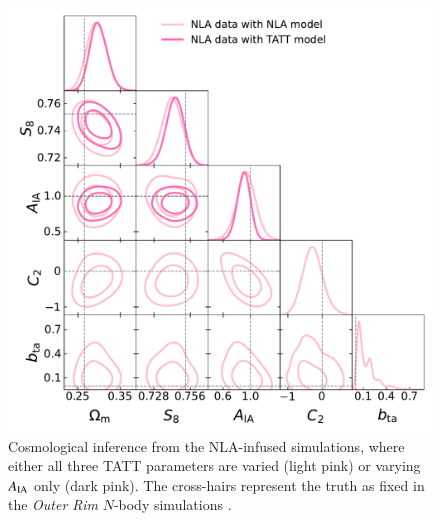 \begin{figure}
\includegraphics[width=\columnwidth]{graphs/NLA_combo.pdf}
\caption{Cosmological inference from the NLA-infused simulations, where either all three TATT parameters are varied (light pink) or varying $A_{\rm IA}$ only (dark pink).
The cross-hairs represent the truth as fixed in the {\it Outer Rim} $N$-body simulations \citep{OuterRim}.}
\label{fig:corner_nla_combo}
\end{figure}